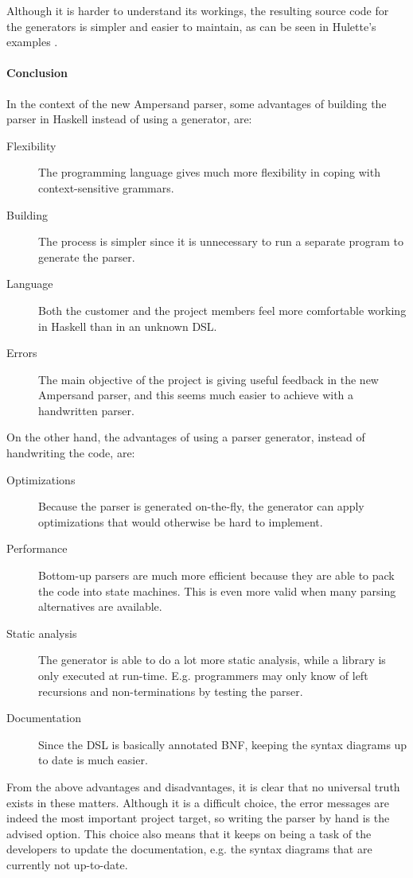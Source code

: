 Although it is harder to understand its workings, the resulting source code for the generators is simpler and easier to maintain, as can be seen in Hulette's examples .

\paragraph{Conclusion}
In the context of the new Ampersand parser, some advantages of building the parser in Haskell instead of using a generator, are:
\begin{description}
	\item[Flexibility] The programming language gives much more flexibility in coping with context-sensitive grammars.
	\item[Building] The process is simpler since it is unnecessary to run a separate program to generate the parser.
	\item[Language] Both the customer and the project members feel more comfortable working in Haskell than in an unknown DSL.
	\item[Errors] The main objective of the project is giving useful feedback in the new Ampersand parser, and this seems much easier to achieve with a handwritten parser.
\end{description}

\noindent
On the other hand, the advantages of using a parser generator, instead of handwriting the code, are:
\begin{description}
	\item[Optimizations] Because the parser is generated on-the-fly, the generator can apply optimizations that would otherwise be hard to implement.
	\item[Performance] Bottom-up parsers are much more efficient because they are able to pack the code into state machines.
		This is even more valid when many parsing alternatives are available.
	\item[Static analysis] The generator is able to do a lot more static analysis, while a library is only executed at run-time.
    E.g. programmers may only know of left recursions and non-terminations by testing the parser.
	\item[Documentation] Since the DSL is basically annotated BNF, keeping the syntax diagrams up to date is much easier.
\end{description}

\noindent
From the above advantages and disadvantages, it is clear that no universal truth exists in these matters.
Although it is a difficult choice, the error messages are indeed the most important project target, so writing the parser by hand is the advised option.
This choice also means that it keeps on being a task of the developers to update the documentation, e.g. the syntax diagrams that are currently not up-to-date.

